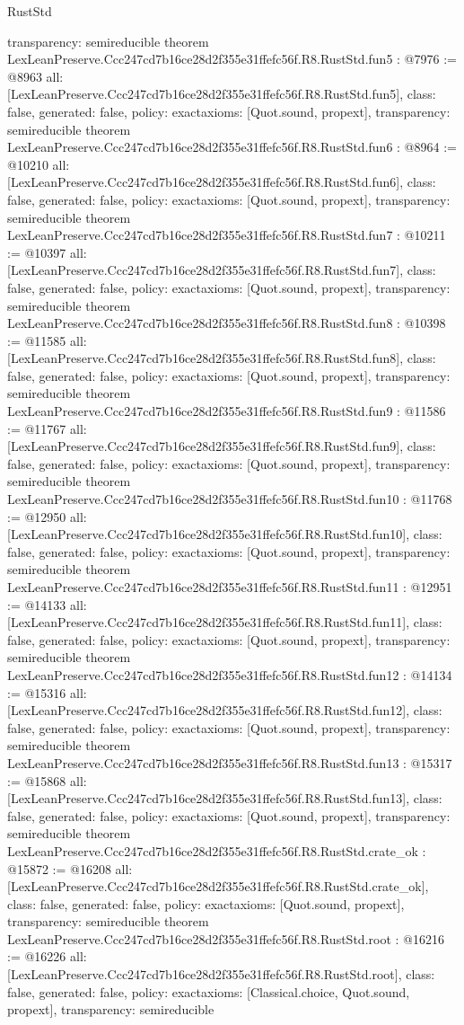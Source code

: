 \begin{lexlean}{RustStd}
\begin{coremodule}
{  transparency: semireducible
}
theorem LexLeanPreserve.Ccc247cd7b16ce28d2f355e31ffefc56f.R8.RustStd.fun5 : @7976 := @8963 {
  all: [LexLeanPreserve.Ccc247cd7b16ce28d2f355e31ffefc56f.R8.RustStd.fun5],
  class: false,
  generated: false,
  policy: exact{axioms: [Quot.sound, propext]},
  transparency: semireducible
}
theorem LexLeanPreserve.Ccc247cd7b16ce28d2f355e31ffefc56f.R8.RustStd.fun6 : @8964 := @10210 {
  all: [LexLeanPreserve.Ccc247cd7b16ce28d2f355e31ffefc56f.R8.RustStd.fun6],
  class: false,
  generated: false,
  policy: exact{axioms: [Quot.sound, propext]},
  transparency: semireducible
}
theorem LexLeanPreserve.Ccc247cd7b16ce28d2f355e31ffefc56f.R8.RustStd.fun7 : @10211 := @10397 {
  all: [LexLeanPreserve.Ccc247cd7b16ce28d2f355e31ffefc56f.R8.RustStd.fun7],
  class: false,
  generated: false,
  policy: exact{axioms: [Quot.sound, propext]},
  transparency: semireducible
}
theorem LexLeanPreserve.Ccc247cd7b16ce28d2f355e31ffefc56f.R8.RustStd.fun8 : @10398 := @11585 {
  all: [LexLeanPreserve.Ccc247cd7b16ce28d2f355e31ffefc56f.R8.RustStd.fun8],
  class: false,
  generated: false,
  policy: exact{axioms: [Quot.sound, propext]},
  transparency: semireducible
}
theorem LexLeanPreserve.Ccc247cd7b16ce28d2f355e31ffefc56f.R8.RustStd.fun9 : @11586 := @11767 {
  all: [LexLeanPreserve.Ccc247cd7b16ce28d2f355e31ffefc56f.R8.RustStd.fun9],
  class: false,
  generated: false,
  policy: exact{axioms: [Quot.sound, propext]},
  transparency: semireducible
}
theorem LexLeanPreserve.Ccc247cd7b16ce28d2f355e31ffefc56f.R8.RustStd.fun10 : @11768 := @12950 {
  all: [LexLeanPreserve.Ccc247cd7b16ce28d2f355e31ffefc56f.R8.RustStd.fun10],
  class: false,
  generated: false,
  policy: exact{axioms: [Quot.sound, propext]},
  transparency: semireducible
}
theorem LexLeanPreserve.Ccc247cd7b16ce28d2f355e31ffefc56f.R8.RustStd.fun11 : @12951 := @14133 {
  all: [LexLeanPreserve.Ccc247cd7b16ce28d2f355e31ffefc56f.R8.RustStd.fun11],
  class: false,
  generated: false,
  policy: exact{axioms: [Quot.sound, propext]},
  transparency: semireducible
}
theorem LexLeanPreserve.Ccc247cd7b16ce28d2f355e31ffefc56f.R8.RustStd.fun12 : @14134 := @15316 {
  all: [LexLeanPreserve.Ccc247cd7b16ce28d2f355e31ffefc56f.R8.RustStd.fun12],
  class: false,
  generated: false,
  policy: exact{axioms: [Quot.sound, propext]},
  transparency: semireducible
}
theorem LexLeanPreserve.Ccc247cd7b16ce28d2f355e31ffefc56f.R8.RustStd.fun13 : @15317 := @15868 {
  all: [LexLeanPreserve.Ccc247cd7b16ce28d2f355e31ffefc56f.R8.RustStd.fun13],
  class: false,
  generated: false,
  policy: exact{axioms: [Quot.sound, propext]},
  transparency: semireducible
}
theorem LexLeanPreserve.Ccc247cd7b16ce28d2f355e31ffefc56f.R8.RustStd.crate_ok : @15872 := @16208 {
  all: [LexLeanPreserve.Ccc247cd7b16ce28d2f355e31ffefc56f.R8.RustStd.crate_ok],
  class: false,
  generated: false,
  policy: exact{axioms: [Quot.sound, propext]},
  transparency: semireducible
}
theorem LexLeanPreserve.Ccc247cd7b16ce28d2f355e31ffefc56f.R8.RustStd.root : @16216 := @16226 {
  all: [LexLeanPreserve.Ccc247cd7b16ce28d2f355e31ffefc56f.R8.RustStd.root],
  class: false,
  generated: false,
  policy: exact{axioms: [Classical.choice, Quot.sound, propext]},
  transparency: semireducible
}


\end{coremodule}
\end{lexlean}
